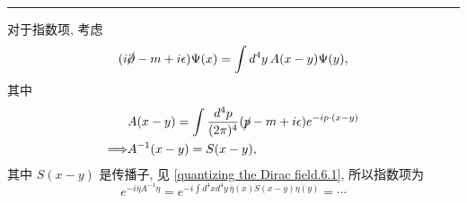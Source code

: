 \begin{itemize}
\begin{tcolorbox}[title=calculation:]
		\noindent\rule[0.5ex]{\linewidth}{0.5pt} %
		
		对于指数项, 考虑
		\begin{equation}
			(i \cancel{\partial} - m + i \epsilon) \Psi(x) = \int d^4 y \, A(x - y) \Psi(y),
		\end{equation}
		其中
		\begin{align}
			& A(x - y) = \int \frac{d^4 p}{(2 \pi)^4} (\cancel{p} - m + i \epsilon) e^{- i p \cdot (x - y)} \notag \\
			\Longrightarrow & A^{- 1}(x - y) = S(x - y),
		\end{align}
		其中 $S(x - y)$ 是传播子, 见 \eqref{quantizing the Dirac field.6.1}, 所以指数项为
		\begin{equation}
			e^{- i \bar{\eta} A^{- 1} \eta} = e^{- i \int d^4 x d^4 y \, \bar{\eta}(x) S(x - y) \eta(y)} = \cdots
		\end{equation}
	\end{tcolorbox}
\end{itemize}

